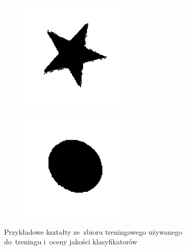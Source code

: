 \documentclass[11pt,a4paper]{article}
\begin{document}
\begin{figure}[H]
\begin{subfigure}[t]{0.2\textwidth}
    \end{subfigure}
    \\
    \begin{subfigure}[t]{0.2\textwidth}
        \centering
        \includegraphics[width=\textwidth]{res/img/star.png}
    \end{subfigure}
    \begin{subfigure}[t]{0.2\textwidth}
        \centering
        \includegraphics[width=\textwidth]{res/img/circle.png}
    \end{subfigure}
    \caption{Przykładowe kształty ze~zbioru treningowego używanego do~treningu i~oceny jakości klasyfikatorów}
    \label{fig:shapes}
\end{figure}
\end{document}
